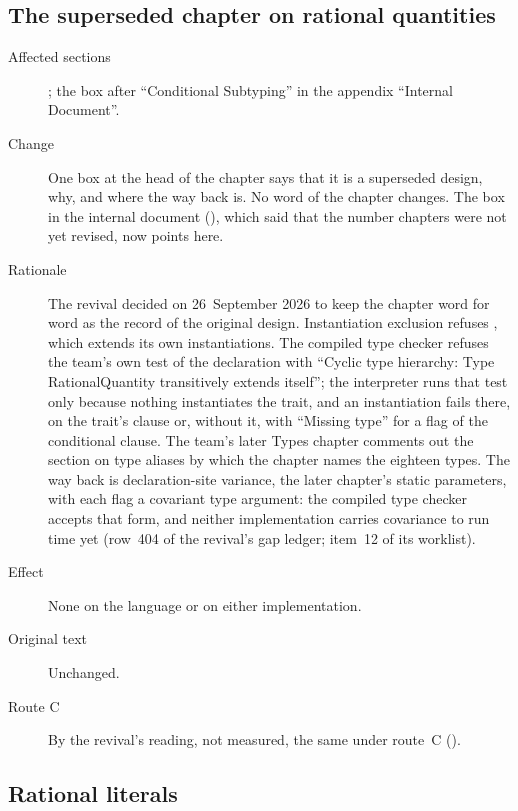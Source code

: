 \subsection{The superseded chapter on rational quantities}

\begin{description}
\item[Affected sections] ; the box after
``Conditional Subtyping'' in the appendix ``Internal Document''.
\item[Change] One box at the head of the chapter says that it is a superseded
design, why, and where the way back is. No word of the chapter changes.
The box in the internal document (), which said
that the number chapters were not yet revised, now points here.
\item[Rationale] The revival decided on 26~September 2026 to keep the chapter
word for word as the record of the original design.
Instantiation exclusion refuses , which extends its own
instantiations.
The compiled type checker refuses the team's own test of the declaration with
``Cyclic type hierarchy: Type RationalQuantity transitively extends itself''; the
interpreter runs that test only because nothing instantiates the trait, and an
instantiation fails there, on the trait's  clause or, without it, with
``Missing type'' for a flag of the conditional  clause.
The team's later Types chapter comments out the section on type aliases by which
the chapter names the eighteen types.
The way back is declaration-site variance, the later chapter's
 static parameters, with each flag a covariant type argument: the
compiled type checker accepts that form, and neither implementation carries
covariance to run time yet (row~404 of the revival's gap ledger; item~12 of its
worklist).
\item[Effect] None on the language or on either implementation.
\item[Original text] Unchanged.
\item[Route C] By the revival's reading, not measured, the same under route~C
().
\end{description}

\subsection{Rational literals}

